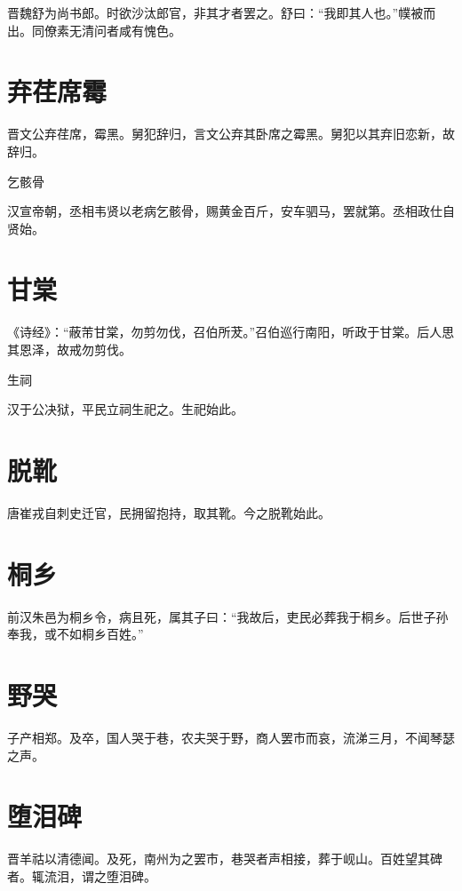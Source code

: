 \documentclass[a4paper,12pt,UTF8,twoside]{ctexbook}
\begin{document}
    晋魏舒为尚书郎。时欲沙汰郎官，非其才者罢之。舒曰：“我即其人也。”幞被而出。同僚素无清问者咸有愧色。
    
    \section{弃荏席霉}
    
    晋文公弃荏席，霉黑。舅犯辞归，言文公弃其卧席之霉黑。舅犯以其弃旧恋新，故辞归。
    
    乞骸骨
    
    汉宣帝朝，丞相韦贤以老病乞骸骨，赐黄金百斤，安车驷马，罢就第。丞相政仕自贤始。
    
    \section{甘棠}
    
    《诗经》：“蔽芾甘棠，勿剪勿伐，召伯所茇。”召伯巡行南阳，听政于甘棠。后人思其恩泽，故戒勿剪伐。
    
    生祠
    
    汉于公决狱，平民立祠生祀之。生祀始此。
    
    \section{脱靴}
    
    唐崔戎自刺史迁官，民拥留抱持，取其靴。今之脱靴始此。
    
    \section{桐乡}
    
    前汉朱邑为桐乡令，病且死，属其子曰：“我故后，吏民必葬我于桐乡。后世子孙奉我，或不如桐乡百姓。”
    
    \section{野哭}
    
    子产相郑。及卒，国人哭于巷，农夫哭于野，商人罢市而哀，流涕三月，不闻琴瑟之声。
    
    \section{堕泪碑}
    
    晋羊祜以清德闻。及死，南州为之罢市，巷哭者声相接，葬于岘山。百姓望其碑者。辄流泪，谓之堕泪碑。
    
\end{document}
